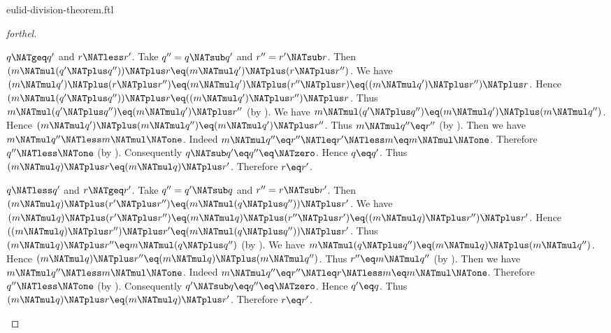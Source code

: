\documentclass{stex}
\begin{document}
\begin{smodule}{eulid-division-theorem.ftl}
\begin{proof}[forthel]
  \begin{case}{$q \NATgeq q'$ and $r \NATless r'$.}
    Take $q'' = q \NATsub q'$ and $r'' = r' \NATsub r$.
    Then $(m \NATmul (q' \NATplus q'')) \NATplus r \eq (m \NATmul q') \NATplus (r \NATplus r'')$.
    We have $(m \NATmul q') \NATplus (r \NATplus r'')
      \eq (m \NATmul q') \NATplus (r'' \NATplus r)
      \eq ((m \NATmul q') \NATplus r'') \NATplus r$.
    Hence $(m \NATmul (q' \NATplus q'')) \NATplus r \eq ((m \NATmul q') \NATplus r'') \NATplus r$.
    Thus $m \NATmul (q' \NATplus q'') \eq (m \NATmul q') \NATplus r''$ (by ).
    We have $m \NATmul (q' \NATplus q'') \eq (m \NATmul q') \NATplus (m \NATmul q'')$.
    Hence $(m \NATmul q') \NATplus (m \NATmul q'') \eq (m \NATmul q') \NATplus r''$.
    Thus $m \NATmul q'' \eq r''$ (by ).
    Then we have $m \NATmul q'' \NATless m \NATmul \NATone$.
    Indeed $m \NATmul q''
      \eq r''
      \NATleq r'
      \NATless m
      \eq m \NATmul \NATone$.
    Therefore $q'' \NATless \NATone$ (by ).
    Consequently $q \NATsub q' \eq q'' \eq \NATzero$.
    Hence $q \eq q'$.
    Thus $(m \NATmul q) \NATplus r \eq (m \NATmul q) \NATplus r'$.
    Therefore $r \eq r'$.
  \end{case}

  \begin{case}{$q \NATless q'$ and $r \NATgeq r'$.}
    Take $q'' = q' \NATsub q$ and $r'' = r \NATsub r'$.
    Then $(m \NATmul q) \NATplus (r' \NATplus r'') \eq (m \NATmul (q \NATplus q'')) \NATplus r'$.
    We have $(m \NATmul q) \NATplus (r' \NATplus r'')
      \eq (m \NATmul q) \NATplus (r'' \NATplus r')
      \eq ((m \NATmul q) \NATplus r'') \NATplus r'$.
    Hence $((m \NATmul q) \NATplus r'') \NATplus r' \eq (m \NATmul (q \NATplus q'')) \NATplus r'$.
    Thus $(m \NATmul q) \NATplus r'' \eq m \NATmul (q \NATplus q'')$ (by ).
    We have $m \NATmul (q \NATplus q'') \eq (m \NATmul q) \NATplus (m \NATmul q'')$.
    Hence $(m \NATmul q) \NATplus r'' \eq (m \NATmul q) \NATplus (m \NATmul q'')$.
    Thus $r'' \eq m \NATmul q''$ (by ).
    Then we have $m \NATmul q'' \NATless m \NATmul \NATone$.
    Indeed $m \NATmul q''
      \eq r''
      \NATleq r
      \NATless m
      \eq m \NATmul \NATone$.
    Therefore $q'' \NATless \NATone$ (by ).
    Consequently $q' \NATsub q \eq q'' \eq \NATzero$.
    Hence $q' \eq q$.
    Thus $(m \NATmul q) \NATplus r \eq (m \NATmul q) \NATplus r'$.
    Therefore $r \eq r'$.
  \end{case}


\end{proof}
\end{smodule}
\end{document}
